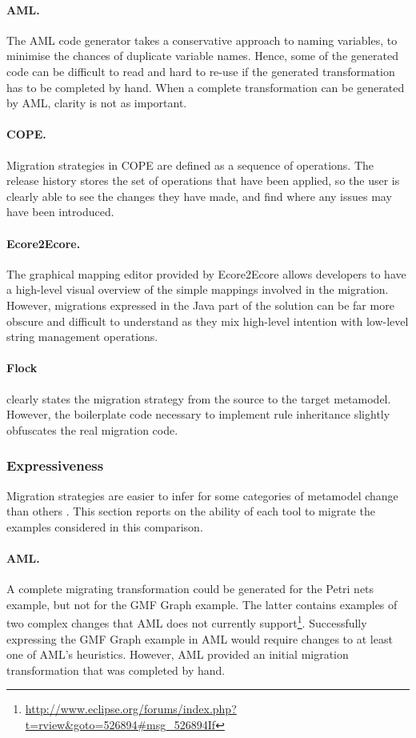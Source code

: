 \paragraph{AML.} The AML code generator takes a conservative approach to naming variables, to minimise the chances of duplicate variable names. Hence, some of the generated code can be difficult to read and hard to re-use if the generated transformation has to be completed by hand. When a complete transformation can be generated by AML, clarity is not as important.

\paragraph{COPE.} Migration strategies in COPE are defined as a sequence of operations. The release history stores the set of operations that have been applied, so the user is clearly able to see the changes they have made, and find where any issues may have been introduced.

\paragraph{Ecore2Ecore.} The graphical mapping editor provided by Ecore2Ecore allows developers to have a high-level visual overview of the simple mappings involved in the migration. However, migrations expressed in the Java part of the solution can be far more obscure and difficult to understand as they mix high-level intention with low-level string management operations.

\paragraph{Flock} clearly states the migration strategy from the source to the target metamodel.
However, the boilerplate code necessary to implement rule inheritance slightly obfuscates the real migration code.



\subsubsection{Expressiveness}
Migration strategies are easier to infer for some categories of metamodel change than others \cite{gruschko07towards}. This section reports on the ability of each tool to migrate the examples considered in this comparison.

\paragraph{AML.} A complete migrating transformation could be generated for the Petri nets example, but not for the GMF Graph example. The latter contains examples of two complex changes that AML does not currently support\footnote{\url{http://www.eclipse.org/forums/index.php?t=rview&goto=526894#msg_526894If}}. Successfully expressing the GMF Graph example in AML would require changes to at least one of AML's heuristics. However, AML provided an initial migration transformation that was completed by hand.

